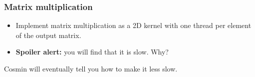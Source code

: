 \documentclass{beamer}
\begin{document}
\begin{frame}
  \frametitle{Matrix multiplication}

  \begin{itemize}
  \item Implement matrix multiplication as a 2D kernel with one thread
    per element of the output matrix.
  \item \textbf{Spoiler alert:} you will find that it is slow.  Why?
  \end{itemize}

  Cosmin will eventually tell you how to make it less slow.

\end{frame}
\end{document}
